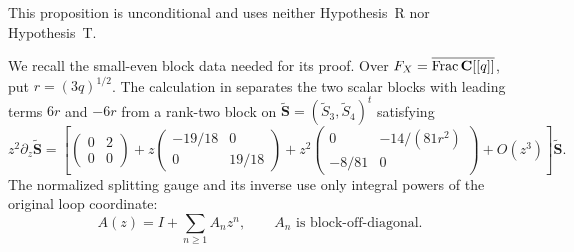 This proposition is unconditional and uses neither Hypothesis~R nor
Hypothesis~T.

We recall the small-even block data needed for its proof.  Over
\(F_X=\overline{\operatorname{Frac}\mathbf C[[q]]}\), put \(r=(3q)^{1/2}\).
The calculation in \cite[Section~2]{RuddM1} separates the two scalar blocks
with leading terms \(6r\) and \(-6r\) from a rank-two block on
\(\widetilde{\mathbf S}=(\widetilde S_3,\widetilde S_4)^t\) satisfying
\begin{equation}
 z^2\partial_z
 \widetilde{\mathbf S}
 =\left[
 \begin{pmatrix}0&2\\0&0\end{pmatrix}
 +z\begin{pmatrix}-19/18&0\\0&19/18\end{pmatrix}
 +z^2\begin{pmatrix}0&-14/(81r^2)\\-8/81&0\end{pmatrix}
 +O(z^3)\right]
 \widetilde{\mathbf S}.
 \label{eq:framed-cubic-block-reduction}
\end{equation}
The normalized splitting gauge and its inverse use only integral powers of
the original loop coordinate:
\begin{equation}
 A(z)=I+\sum_{n\ge1}A_nz^n,
 \qquad A_n\text{ is block-off-diagonal}.
 \label{eq:framed-cubic-block-gauge}
\end{equation}

